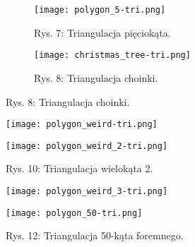 \begin{figure}[!h]
    \centering
    \begin{subfigure}{.5\textwidth}
      \centering
      \texttt{[image: polygon\_5-tri.png]}
      \caption*{Rys. 7: Triangulacja pięciokąta.}
      \label{fig:sub1}
    \end{subfigure}%
    \begin{subfigure}{.5\textwidth}
      \centering
      \texttt{[image: christmas\_tree-tri.png]}
      \caption*{Rys. 8: Triangulacja choinki.}
      \label{fig:sub2}
    \end{subfigure}
    \label{fig:test}
    \end{figure}


    \begin{figure}[!h]
    \centering
    \begin{minipage}{.5\textwidth}
      \centering
      \texttt{[image: polygon\_weird-tri.png]}
      \caption*{Rys. 9: Triangulacja wielokąta 1.}
      \label{fig:test1}
    \end{minipage}%
    \begin{minipage}{.5\textwidth}
      \centering
      \texttt{[image: polygon\_weird\_2-tri.png]}
      \caption*{Rys. 10: Triangulacja wielokąta 2.}
      \label{fig:test2}
    \end{minipage}
    \end{figure}
    \begin{figure}[!h]
        \centering
        \begin{minipage}{.5\textwidth}
          \centering
          \texttt{[image: polygon\_weird\_3-tri.png]}
          \caption*{Rys. 11: Triangulacja wielokąta 3.}
          \label{fig:test1}
        \end{minipage}%
        \begin{minipage}{.5\textwidth}
          \centering
          \texttt{[image: polygon\_50-tri.png]}
          \caption*{Rys. 12: Triangulacja 50-kąta foremnego.}
          \label{fig:test2}
        \end{minipage}
        \end{figure}